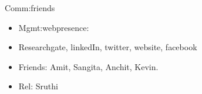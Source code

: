 \documentclass[serif, mathserif, final]{beamer}
\begin{document}
\begin{frame}
\begin{columns}
\begin{column}{0.25\linewidth}
\begin{block}{Comm:friends} 
\begin{itemize}
\item Mgmt:webpresence: 
\item Researchgate, linkedIn, twitter, website, facebook 
\item Friends: Amit, Sangita, Anchit, Kevin. 
\item Rel: Sruthi 
\end{itemize} 
\end{block} 


\end{column}%
\end{columns}
\end{frame}
\end{document}
